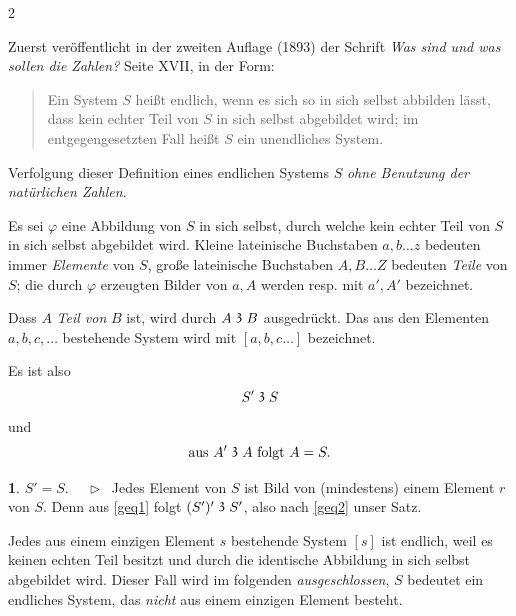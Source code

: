 \documentclass[leqno,hidelinks,10pt]{article}
\theoremstyle{definition}
\newtheorem{satz}{\protect\satzname}
\newcommand{\satzname}{}
\renewcommand{\satzname}{\hspace{-4pt}.\ Satz}%
\renewcommand{\satzname}{\hspace{-4pt}.\ Theorem}%
\newcommand\Beweis{\medskip \newline $ \phantom{'.'} \rhd \ $}%
\newcommand\TeilVon{\mathrel{\raisebox{0.45ex}{$\mathfrak{3}$}}}
\begin{document}
\begin{paracol}{2} %
    \begin{leftcolumn}

\noindent Zuerst veröffentlicht in der zweiten Auflage (1893) der Schrift
\textit{\glqq Was sind und was sollen die Zahlen?\grqq{}} Seite XVII, in der Form:%

\begin{quote}
Ein System $S$ heißt endlich, wenn es sich so in sich selbst abbilden
lässt, dass kein echter Teil von $S$ in sich selbst abgebildet
wird; im entgegengesetzten Fall heißt $S$ ein unendliches System.
\end{quote}

Verfolgung dieser Definition eines endlichen Systems $S$
\emph{ohne Benutzung der natürlichen Zahlen}.

Es sei $\varphi$ eine Abbildung von $S$ in sich selbst, durch welche kein echter
Teil von $S$ in sich selbst abgebildet wird.
Kleine lateinische Buchstaben  $a, b \ldots z$ bedeuten immer \emph{Elemente} von
$S$, große lateinische Buchstaben $A, B \ldots Z$ bedeuten \emph{Teile} von $S$;
die durch $\varphi$ erzeugten Bilder von $a, A$ werden resp. mit $a', A'$ bezeichnet.

Dass $A$ \emph{Teil von} $B$ ist, wird durch $A \TeilVon B$ ausgedrückt. Das aus den
Elementen $a, b, c, \ldots $ bestehende System wird mit $[a, b, c \ldots]$ bezeichnet.

Es ist also
\begin{equation}\label{geq1}
				S' \TeilVon S
\end{equation}
und%
\begin{equation}\label{geq2}
		\text{aus } A' \TeilVon A \text{ folgt } A = S.
\end{equation}

\begin{satz}\label{gthm1}$S' = S$.
\Beweis
Jedes Element von $S$ ist Bild von (mindestens) einem Element $r$ von $S$. Denn
aus \eqref{geq1} folgt $(S')' \TeilVon S'$, also nach \eqref{geq2} unser Satz.
\end{satz}
Jedes aus einem einzigen Element $s$ bestehende System $[s]$ ist endlich, weil
es keinen echten Teil besitzt und durch die identische Abbildung in sich selbst
abgebildet wird. Dieser Fall wird im folgenden \emph{ausgeschlossen}, $S$ bedeutet
ein endliches System, das \emph{nicht} aus einem einzigen Element besteht.


\end{leftcolumn}
\end{paracol}
\end{document}
